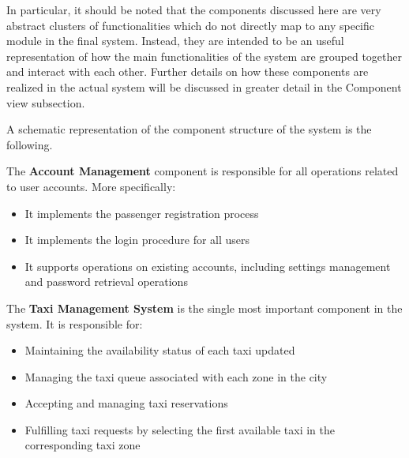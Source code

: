 In particular, it should be noted that the components discussed here are very abstract clusters of functionalities which do not directly map to any specific module in the final system. Instead, they are intended to be an useful representation of how the main functionalities of the system are grouped together and interact with each other. Further details on how these components are realized in the actual system will be discussed in greater detail in the Component view subsection.

A schematic representation of the component structure of the system is the following.
\begin{figure}[H]
\centering
{}
\end{figure}

The \textbf{Account Management} component is responsible for all operations related to user accounts. More specifically:
	\begin{itemize}
		\item It implements the passenger registration process
		\item It implements the login procedure for all users 
		\item It supports operations on existing accounts, including settings management and password retrieval operations
	\end{itemize}

The \textbf{Taxi Management System} is the single most important component in the system. It is responsible for:
	\begin{itemize}
		\item Maintaining the availability status of each taxi updated
		\item Managing the taxi queue associated with each zone in the city
		\item Accepting and managing taxi reservations
		\item Fulfilling taxi requests by selecting the first available taxi in the corresponding taxi zone  
	\end{itemize}
	
